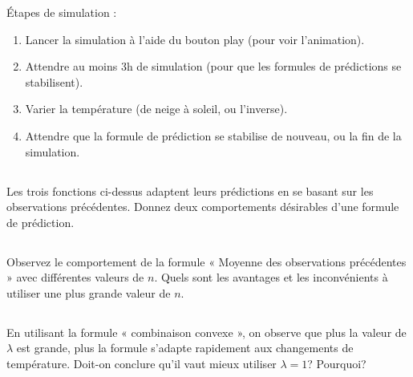 \documentclass[letterpaper,12pt]{article}
\begin{document}
	Étapes de simulation : 
	\begin{enumerate}
		\item Lancer la simulation à l’aide du bouton play (pour voir l’animation).
		\item Attendre au moins 3h de simulation (pour que les formules de prédictions se stabilisent).
		\item Varier la température (de neige à soleil, ou l’inverse).
		\item Attendre que la formule de prédiction se stabilise de nouveau, ou la fin de la simulation.
	\end{enumerate}
	
	
	
	\subsection{}
	
	Les trois fonctions ci-dessus adaptent leurs prédictions en se basant sur les observations
	précédentes. Donnez deux comportements désirables d'une formule de prédiction.
	

	
	
	
	
	
	
	\subsection{}
	Observez le comportement de la formule « Moyenne des observations précédentes » avec différentes valeurs de $n$. Quels sont les avantages et les inconvénients à utiliser une plus grande valeur de $n$. 
	
	\subsection{}
	En utilisant la formule « combinaison convexe », on observe que plus la valeur de $\lambda$ est grande, plus la formule s’adapte rapidement aux changements de température. Doit-on conclure qu’il vaut mieux utiliser $\lambda=1$? Pourquoi?
	
\end{document}
